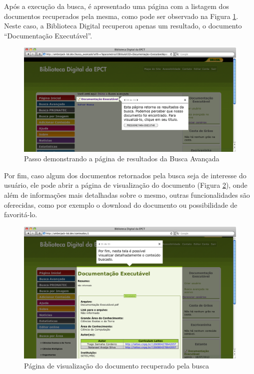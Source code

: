 Após a execução da busca, é apresentado uma página com a listagem dos documentos recuperados pela mesma, como pode ser observado na Figura \ref{tour_6}. Neste caso, a Biblioteca Digital recuperou apenas um resultado, o documento “Documentação Executável”.

\begin{figure}[ht]
    \centering
    \includegraphics[width=0.9 \textwidth]{figuras/tour_6}
    \caption{Passo demonstrando a página de resultados da Busca Avançada}
    \label{tour_6}
\end{figure}

\pagebreak

Por fim, caso algum dos documentos retornados pela busca seja de interesse do usuário, ele pode abrir a página de visualização do documento (Figura \ref{tour_7}), onde além de informações mais detalhadas sobre o mesmo, outras funcionalidades são oferecidas, como por exemplo o download do documento ou possibilidade de favoritá-lo.

\begin{figure}[ht]
    \centering
    \includegraphics[width=0.9 \textwidth]{figuras/tour_7}
    \caption{Página de visualização do documento recuperado pela busca}
    \label{tour_7}
\end{figure}

